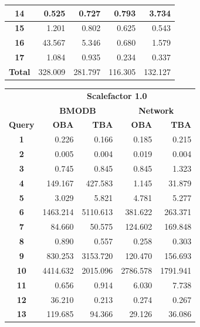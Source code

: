 \documentclass[a4paper]{article}
\begin{document}
{\begin{figure}[h]
\begin{minipage}{0.5\linewidth}
\begin{tiny}
\begin{tabular}{|c|r|r|r|r|}
        \hline
        \textbf{14}&0.525&0.727&0.793&3.734\\
        \hline
        \textbf{15}&1.201&0.802&0.625&0.543\\
        \hline
        \textbf{16}&43.567&5.346&0.680&1.579\\
        \hline
        \textbf{17}&1.084&0.935&0.234&0.337\\
        \hline
        \textbf{Total}&328.009&281.797&116.305&132.127\\
        \hline
      \end{tabular}
    \end{tiny}
  \end{minipage} \hfill
\begin{minipage}{0.5\linewidth}
    \begin{tiny}
      \begin{tabular}{|c|r|r|r|r|}
        \hline
        &\multicolumn{4}{c|}{\textbf{Scalefactor 1.0}}\\
        \cline{2-5}
        &\multicolumn{2}{c|}{\textbf{BMODB}}&\multicolumn{2}{c|}{\textbf{Network}}\\
        \hline
        \textbf{Query}&\textbf{OBA}&\textbf{TBA}&\textbf{OBA}&\textbf{TBA}\\
        \hline
        \textbf{1}&0.226&0.166&0.185&0.215\\
        \hline
        \textbf{2}&0.005&0.004&0.019&0.004\\
        \hline
        \textbf{3}&0.745&0.845&0.845&1.323\\
        \hline
        \textbf{4}&149.167&427.583&1.145&31.879\\
        \hline
         \textbf{5}&3.029&5.821&4.781&5.277\\
        \hline
        \textbf{6}&1463.214&5110.613&381.622&263.371\\
        \hline
        \textbf{7}&84.660&50.575&124.602&169.848\\
        \hline
        \textbf{8}&0.890&0.557&0.258&0.303\\
        \hline
        \textbf{9}&830.253&3153.720&120.470&156.693\\
        \hline
        \textbf{10}&4414.632&2015.096&2786.578&1791.941\\
        \hline
        \textbf{11}&0.656&0.914&6.030&7.738\\
        \hline
        \textbf{12}&36.210&0.213&0.274&0.267\\
        \hline
        \textbf{13}&119.685&94.366&29.126&36.086\\

\end{tabular}
\end{tiny}
\end{minipage}
\end{figure}}
\end{document}
